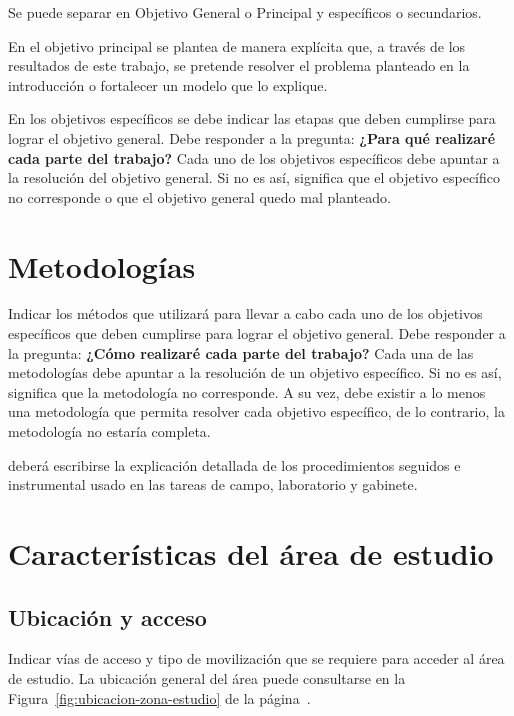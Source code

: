        Se puede separar en Objetivo General o Principal y específicos o secundarios. \par
   
        En el objetivo principal se plantea de manera explícita que, a través de los resultados de este trabajo, se pretende resolver el problema planteado en la introducción o fortalecer un modelo que lo explique.\par
         
        En los objetivos específicos se debe indicar las etapas que deben cumplirse para lograr el objetivo general. Debe responder a la pregunta: \textbf{¿Para qué realizaré cada parte del trabajo?} Cada uno de los objetivos específicos debe apuntar a la resolución del objetivo general. Si no es así, significa que el objetivo específico no corresponde o que el objetivo general quedo mal planteado.

        
\section{Metodologías}
Indicar los métodos que utilizará para llevar a cabo cada uno de los objetivos específicos que deben cumplirse para lograr el objetivo general. Debe responder a la pregunta: \textbf{¿Cómo realizaré cada parte del trabajo?} Cada una de las metodologías debe apuntar a la resolución de un objetivo específico. Si no es así, significa que la metodología no corresponde. A su vez, debe existir a lo menos una metodología que permita resolver cada objetivo específico, de lo contrario, la metodología no estaría completa.\par
            deberá escribirse la explicación detallada de los procedimientos seguidos e instrumental usado en las tareas de campo, laboratorio y gabinete.
     
\section{Características del área de estudio}
            \subsection{Ubicación y acceso}
            Indicar vías de acceso y tipo de movilización que se requiere para acceder al área de estudio.
            La ubicación general del área puede consultarse en la
            Figura~\ref{fig:ubicacion-zona-estudio} de la
            página~\pageref{fig:ubicacion-zona-estudio}.
